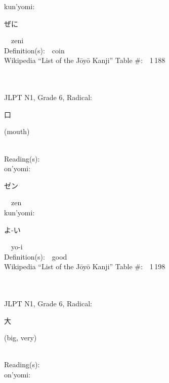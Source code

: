 \begin{multicols}{2}
{\hspace*{1em}}kun'yomi:\ \ \\
{\hspace*{2em}}{\begin{CJK}{UTF8}{min} ぜに \end{CJK}}\ \ zeni\ \ \\
Definition(s):\ \ coin \\
Wikipedia ``List of the J\=oy\=o Kanji'' Table \#:\ \ 1\,188 \\
\ \ \\
{\fontsize{34pt}{40pt}  }\ \ \\  %
{JLPT N1, Grade 6, Radical:\ \ {\begin{CJK}{UTF8}{min} 口 \end{CJK}} (mouth) } \\
Reading(s):\ \ \\
{\hspace*{1em}}on'yomi:\ \ \\
{\hspace*{2em}}{\begin{CJK}{UTF8}{min} ゼン \end{CJK}}\ \ zen\ \ \\
{\hspace*{1em}}kun'yomi:\ \ \\
{\hspace*{2em}}{\begin{CJK}{UTF8}{min} よ-い \end{CJK}}\ \ yo-i\ \ \\
Definition(s):\ \ good \\
Wikipedia ``List of the J\=oy\=o Kanji'' Table \#:\ \ 1\,198 \\
\ \ \\
{\fontsize{34pt}{40pt}  }\ \ \\  %
{JLPT N1, Grade 6, Radical:\ \ {\begin{CJK}{UTF8}{min} 大 \end{CJK}} (big, very) } \\
Reading(s):\ \ \\
{\hspace*{1em}}on'yomi:\ \ \\

\end{multicols}
